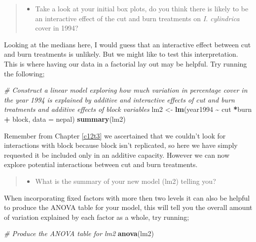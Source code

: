 \documentclass[
]{book}
\newenvironment{Shaded}{\begin{snugshade}}{\end{snugshade}}
\newcommand{\AttributeTok}[1]{\textcolor[rgb]{0.13,0.29,0.53}{#1}}
\newcommand{\CommentTok}[1]{\textcolor[rgb]{0.56,0.35,0.01}{\textit{#1}}}
\newcommand{\FunctionTok}[1]{\textcolor[rgb]{0.13,0.29,0.53}{\textbf{#1}}}
\newcommand{\NormalTok}[1]{#1}
\newcommand{\OtherTok}[1]{\textcolor[rgb]{0.56,0.35,0.01}{#1}}
\newcommand{\SpecialCharTok}[1]{\textcolor[rgb]{0.81,0.36,0.00}{\textbf{#1}}}
\providecommand{\tightlist}{%
  \setlength{\itemsep}{0pt}\setlength{\parskip}{0pt}}
\begin{document}
\begin{quote}
\begin{itemize}
\tightlist
\item
  Take a look at your initial box plots, do you think there is likely to be an interactive effect of the cut and burn treatments on \emph{I. cylindrica} cover in 1994?
\end{itemize}
\end{quote}

Looking at the medians here, I would guess that an interactive effect between cut and burn treatments is unlikely. But we might like to test this interpretation. This is where having our data in a factorial lay out may be helpful. Try running the following;

\begin{Shaded}
\begin{Highlighting}[]
\CommentTok{\# Construct a linear model exploring how much variation in percentage cover in the year 1994 is explained by additive and interactive effects of cut and burn treatments and additive effects of block variables}
\NormalTok{lm2 }\OtherTok{\textless{}{-}} \FunctionTok{lm}\NormalTok{(year1994 }\SpecialCharTok{\textasciitilde{}}\NormalTok{ cut }\SpecialCharTok{*}\NormalTok{burn }\SpecialCharTok{+}\NormalTok{ block, }\AttributeTok{data =}\NormalTok{ nepal)}
\FunctionTok{summary}\NormalTok{(lm2)}
\end{Highlighting}
\end{Shaded}

Remember from Chapter \ref{c12t3} we ascertained that we couldn't look for interactions with block because block isn't replicated, so here we have simply requested it be included only in an additive capacity. However we can now explore potential interactions between cut and burn treatments.

\begin{quote}
\begin{itemize}
\tightlist
\item
  What is the summary of your new model (lm2) telling you?
\end{itemize}
\end{quote}

When incorporating fixed factors with more then two levels it can also be helpful to produce the ANOVA table for your model, this will tell you the overall amount of variation explained by each factor as a whole, try running;

\begin{Shaded}
\begin{Highlighting}[]
\CommentTok{\# Produce the ANOVA table for lm2}
\FunctionTok{anova}\NormalTok{(lm2)}
\end{Highlighting}
\end{Shaded}
\end{document}
